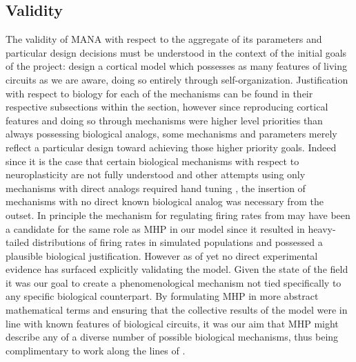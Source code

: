 \documentclass[10pt,letterpaper]{article}
\begin{document}
	 
\subsection*{Validity}
	 
The validity of MANA with respect to the aggregate of its parameters and particular design decisions must be understood in the context of the initial goals of the project: design a cortical model which possesses as many features of living circuits as we are aware, doing so entirely through self-organization.  Justification with respect to biology for each of the mechanisms can be found in their respective subsections within the  section, however since reproducing cortical features and doing so through mechanisms were higher level priorities than always possessing biological analogs, some mechanisms and parameters merely reflect a particular design toward achieving those higher priority goals. Indeed since it is the case that certain biological mechanisms with respect to neuroplasticity are not fully understood and other attempts using only mechanisms with direct analogs required hand tuning \cite{miner2016plasticity}, the insertion of mechanisms with no direct known biological analog was necessary from the outset. In principle the mechanism for regulating firing rates from \cite{sweeney2015diffusive} may have been a candidate for the same role as MHP in our model since it resulted in heavy-tailed distributions of firing rates in simulated populations and possessed a plausible biological justification. However as of yet no direct experimental evidence has surfaced explicitly validating the model. Given the state of the field it was our goal to create a phenomenological mechanism not tied specifically to any specific biological counterpart. By formulating MHP in more abstract mathematical terms and ensuring that the collective results of the model were in line with known features of biological circuits, it was our aim that MHP might describe any of a diverse number of possible biological mechanisms, thus being complimentary to work along the lines of \cite{sweeney2015diffusive}.

	 
\end{document}
